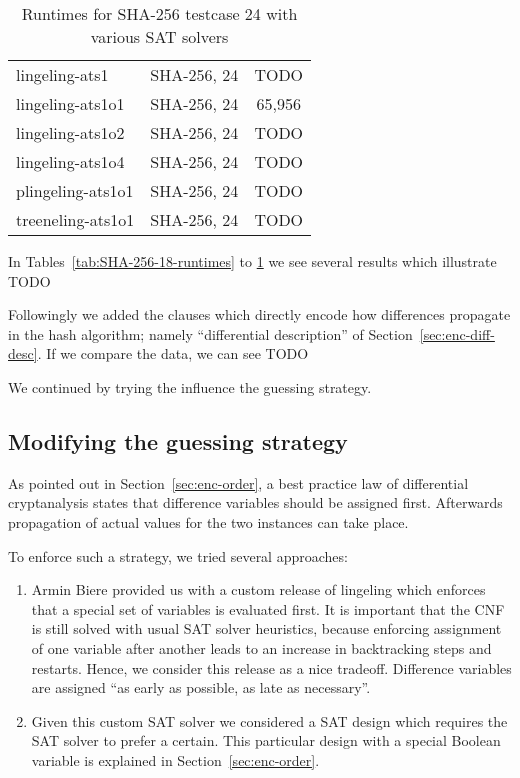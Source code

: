 \begin{table}[!h]
\begin{center}
\begin{tabular}{lcc}
      lingeling-ats1            & SHA-256, 24   & TODO \\
      lingeling-ats1o1          & SHA-256, 24   & 65,956 \\
      lingeling-ats1o2          & SHA-256, 24   & TODO \\
      lingeling-ats1o4          & SHA-256, 24   & TODO \\
      plingeling-ats1o1         & SHA-256, 24   & TODO \\
      treeneling-ats1o1         & SHA-256, 24   & TODO
    \end{tabular}
    \caption{Runtimes for SHA-256 testcase 24 with various SAT solvers}
    \label{tab:SHA-256-24-runtimes}
  \end{center}
\end{table}

In Tables~\ref{tab:SHA-256-18-runtimes} to \ref{tab:SHA-256-24-runtimes}
we see several results which illustrate TODO


Followingly we added the clauses which directly encode how differences
propagate in the hash algorithm; namely \enquote{differential description}
of Section~\ref{sec:enc-diff-desc}. If we compare the data, we can see
TODO

We continued by trying the influence the guessing strategy.

\subsection{Modifying the guessing strategy}
\label{sec:results-guessing}
%
As pointed out in Section~\ref{sec:enc-order}, a best practice law of
differential cryptanalysis states that difference variables should be
assigned first. Afterwards propagation of actual values for the two
instances can take place.

To enforce such a strategy, we tried several approaches:
\begin{enumerate}
  \item
    Armin Biere provided us with a custom release of lingeling
    which enforces that a special set of variables is evaluated
    first. It is important that the CNF is still solved
    with usual SAT solver heuristics, because enforcing
    assignment of one variable after another leads to an increase
    in backtracking steps and restarts. Hence, we consider this
    release as a nice tradeoff. Difference variables are assigned
    \enquote{as early as possible, as late as necessary}.
  \item
    Given this custom SAT solver we considered a SAT design which
    requires the SAT solver to prefer a certain. This particular
    design with a special Boolean variable is explained in
    Section~\ref{sec:enc-order}.
\end{enumerate}

